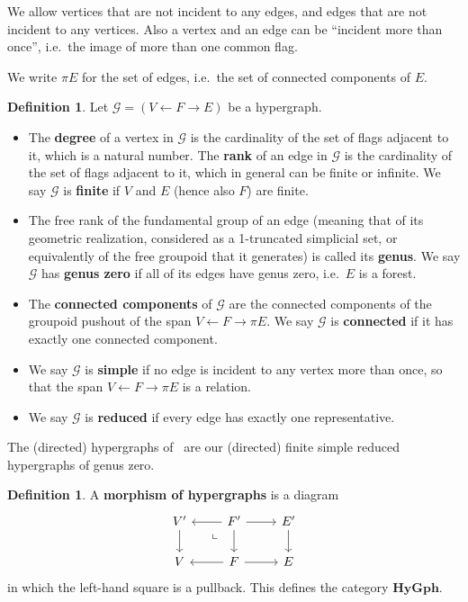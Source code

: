 \documentclass{article}
\theoremstyle{definition}
\newtheorem{defn}[thm]{Definition}
\theoremstyle{remark}
\def\G{\mathcal{G}}
\newcommand{\dlpullback}[1][dl]{\ar[#1,phantom,near start,"\llcorner"]}
\let\ot\leftarrow
\def\hy{\mathbf{HyGph}}
\begin{document}
We allow vertices that are not incident to any edges, and edges that are not incident to any vertices.
Also a vertex and an edge can be ``incident more than once'', i.e.\ the image of more than one common flag.

We write $\pi E$ for the set of edges, i.e.\ the set of connected components of $E$.

\begin{defn}
  Let $\G=(V\ot F\to E)$ be a hypergraph.
  \begin{itemize}
  \item The \textbf{degree} of a vertex in $\G$ is the cardinality of the set of flags adjacent to it, which is a natural number.
    The \textbf{rank} of an edge in $\G$ is the cardinality of the set of flags adjacent to it, which in general can be finite or infinite.
    We say $\G$ %
    is \textbf{finite} if $V$ and $E$ (hence also $F$) are finite.
  \item The free rank of the fundamental group of an edge (meaning that of its geometric realization, considered as a 1-truncated simplicial set, or equivalently of the free groupoid that it generates) is called its \textbf{genus}.
    We say $\G$ has \textbf{genus zero} if all of its edges have genus zero, i.e.\ $E$ is a forest.
  \item The \textbf{connected components} of $\G$ are the connected components of the groupoid pushout of the span $V \leftarrow F \to \pi E$.
    We say $\G$ is \textbf{connected} if it has exactly one connected component.
  \item We say $\G$ is \textbf{simple} if no edge is incident to any vertex more than once, so that the span $V \ot F \to \pi E$ is a relation.
  \item We say $\G$ is \textbf{reduced} if every edge has exactly one representative.
  \end{itemize}
\end{defn}

The (directed) hypergraphs of~\cite{glpn:directed-hypergraphs} are our (directed) finite simple reduced hypergraphs of genus zero.

\begin{defn}
  A \textbf{morphism of hypergraphs} is a diagram
  \[
  \begin{tikzcd}
    V' \ar[d] & F' \ar[d] \ar[r] \ar[l] \dlpullback[dl] & E' \ar[d]\\
    V  & F \ar[r] \ar[l] & E
  \end{tikzcd}
  \]
  in which the left-hand square is a pullback.
  This defines the category $\hy$.
\end{defn}
\end{document}
